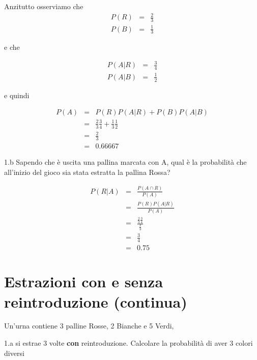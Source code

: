 \documentclass[
  11pt,
]{book}
\theoremstyle{mytheoremstyle}
\theoremstyle{mydefstyle}
\newenvironment{sol}
  {
  \begin{tcolorbox}[enhanced,breakable,arc=0.1mm,boxrule=1pt,colback=white,colframe=iblue,
  title=\bf \fontfamily{lmss}\selectfont \hspace{.5 cm} Soluzione,drop fuzzy shadow]

}{
\end{tcolorbox}
  }
\begin{document}
\begin{sol}
Anzitutto osserviamo che
\begin{eqnarray*}
  P(R) &=&  \frac23\\
  P(B) &=& \frac13
\end{eqnarray*}

e che

\begin{eqnarray*}
  P(A|R) &=&  \frac34\\
  P(A|B) &=& \frac12
\end{eqnarray*}

e quindi

\begin{eqnarray*}
  P(A) &=&  P(R)P(A|R)+P(B)P(A|B)\\
   &=& \frac23\frac34+\frac13\frac12\\
   &=& \frac23\\
   &=& 0.66667
\end{eqnarray*}

\end{sol}

1.b Sapendo che è uscita una pallina marcata con A, qual è la probabilità che all'inizio del gioco sia stata estratta la pallina Rossa?

\begin{sol}
\begin{eqnarray*}
  P(R|A)  &=&  \frac{P(A\cap R)}{P(A)}\\
          &=&  \frac{P(R)P(A|R)}{P(A)}\\
          &=&  \frac{\frac23\frac34}{\frac23}\\
          &=&  \frac34\\
          &=& 0.75
\end{eqnarray*}

\end{sol}

\section{Estrazioni con e senza reintroduzione (continua)}\label{estrazioni-con-e-senza-reintroduzione-continua}

Un'urna contiene 3 palline Rosse, 2 Bianche e 5 Verdi,

1.a si estrae 3 volte \textbf{con} reintroduzione.
Calcolare la probabilità di aver 3 colori diversi
\end{document}
